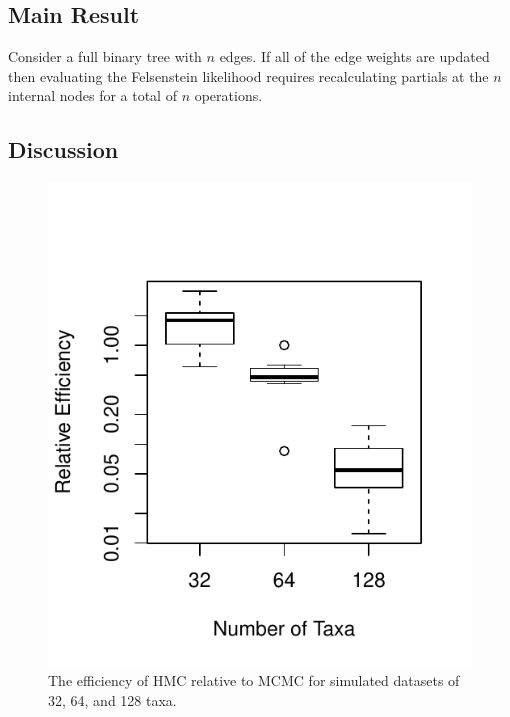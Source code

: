 \documentclass{article}
\begin{document}
    \subsection*{Main Result}

    Consider a full binary tree with $n$ edges. If all of the edge weights are
        updated then evaluating the Felsenstein likelihood requires
        recalculating partials at the $n$ internal nodes for a total of $n$
        operations.


    \subsection*{Discussion}

    \begin{figure}
        \centering
        \includegraphics[scale=0.8]{boxplot.pdf}
        \caption{The efficiency of \ac{HMC} relative to \ac{MCMC} for simulated
                 datasets of 32, 64, and 128 taxa.}
    \end{figure}

    \printbibliography
\end{document}
